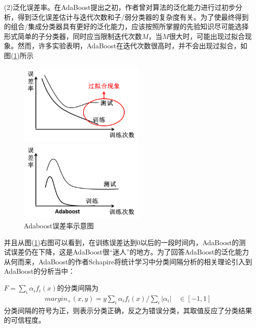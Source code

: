             \par
            (2)泛化误差率。在AdaBoost提出之初，作者曾对算法的泛化能力进行过初步分析，得到泛化误差估计与迭代次数和子/弱分类器的复杂度有关。为了使最终得到的组合/集成分类器具有更好的泛化能力，应该按照所掌握的先验知识尽可能选择形式简单的子分类器，同时应当限制迭代次数$M$，当$M$很大时，可能出现过拟合现象。然而，许多实验表明，AdaBoost在迭代次数很高时，并不会出现过拟合，如图(\ref{fig:Adaboost误差率示意图})所示
            	\begin{figure}[H]
  				\centering
  				\begin{varwidth}[t]{\textwidth}
    			\vspace{0pt}
    			\includegraphics[height=4cm]{images/Adaboost1.jpg}
  				\end{varwidth}
  				\qquad
  				\begin{varwidth}[t]{\textwidth}
    			\vspace{0pt}
    			\includegraphics[height=4cm]{images/Adaboost2.jpg}
  				\end{varwidth}
				\caption{Adaboost误差率示意图}
				\label{fig:Adaboost误差率示意图}
				\end{figure}
            并且从图(\ref{fig:Adaboost误差率示意图})右图可以看到，在训练误差达到0以后的一段时间内，AdaBoost的测试误差仍在下降，这是AdaBoost很“迷人”的地方。为了回答AdaBoost的泛化能力从何而来，AdaBoost的作者Schapire将统计学习中分类间隔分析的相关理论引入到AdaBoost的分析当中：
            \begin{definition}
            $F = \sum_i \alpha_i f_i(x)$的分类间隔为
            \begin{align*}
            margin_+ (x,y) = y\sum_i\alpha_i f_i(x)\big/\sum_i|\alpha_i| \quad \in [-1,1]
            \end{align*}
            分类间隔的符号为正，则表示分类正确，反之为错误分类，其取值反应了分类结果的可信程度。
            \end{definition}
